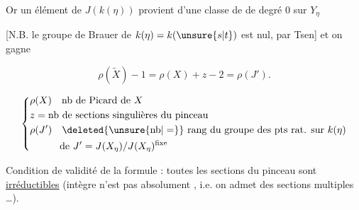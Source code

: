  Or un élément de
$J(k(\eta))$  provient  d’une classe de
 de degré $0$ sur $Y_\eta$

[N.B. le groupe de Brauer de $k(\eta)=k(\unsure{s|t})$
est nul, par Tsen] et on gagne

\[
 \boxed{\rho(\widetilde X)-1=}\boxed{\rho(X)+z-2=\rho(J')}.
\]

\[
\left\{\begin{aligned}
&\rho(X)\quad\text{nb de Picard de }X\\
&z=\text{nb de sections singulières du pinceau}\\
&\rho(J')\quad\deleted{\unsure{\mathrm{nb}|=}}\ \text{rang du groupe des pts rat. sur }k(\eta)\\
&\hspace{3em}\text{de }J'=J(X_\eta)/J(X_\eta)^{\rm fixe}
\end{aligned}\right.
\]

Condition de validité de la formule :
toutes les sections du pinceau sont 
\uline{irréductibles} (intègre n’est pas absolument ,
i.e. on admet des sections multiples \ldots).
